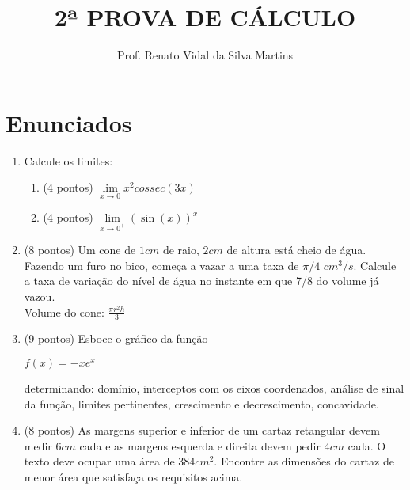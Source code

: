 \documentclass[12pt]{article}
\begin{document}
\date{}
\title{2ª PROVA DE CÁLCULO}
\author{Prof. Renato Vidal da Silva Martins}
\maketitle

\part{Enunciados}
\begin{enumerate}
	\item Calcule os limites:
	\begin{enumerate}
		\item (4 pontos) $ \lim\limits_{x \rightarrow 0}x^2 cossec(3x) $
		\item (4 pontos) $ \lim\limits_{x \rightarrow 0^{+}} (\sin(x))^x $
	\end{enumerate}
	\item (8 pontos) Um cone de $1 cm$ de raio, $2 cm$ de altura está cheio de água. Fazendo um furo no bico, começa a vazar a uma taxa de $\pi/4$ $cm^3/s$. Calcule a taxa de variação do nível de água no instante em que 7/8 do volume já vazou.\\Volume do cone: $\frac{\pi r^2 h}{3}$
	\item (9 pontos) Esboce o gráfico da função
	\begin{center}
		$ f(x) =  -xe^x$
	\end{center}
	
	determinando: domínio, interceptos com os eixos coordenados, análise de sinal da função, limites pertinentes, crescimento e decrescimento, concavidade.
	\item (8 pontos) As margens superior e inferior de um cartaz retangular devem medir $6cm$ cada e as margens esquerda e direita devem pedir $4cm$ cada. O texto deve ocupar uma área de $384cm^2$. Encontre as dimensões do cartaz de menor área que satisfaça os requisitos acima.
\end{enumerate}

\newpage
\end{document}
